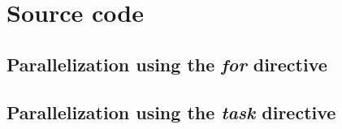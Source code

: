 \chapter{Source code}

\section{Parallelization using the \textit{for} directive}
\label{for}


\section{Parallelization using the \textit{task} directive}
\label{task}

